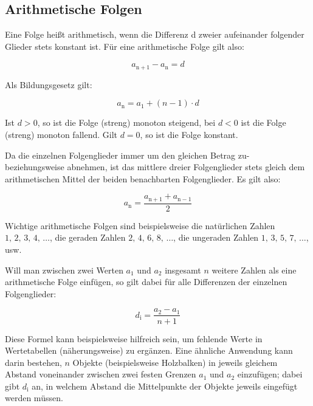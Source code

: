 \newpage
\subsection{Arithmetische Folgen}

Eine Folge heißt arithmetisch, wenn die Differenz d zweier aufeinander folgender Glieder stets konstant ist.
Für eine arithmetische Folge gilt also:

$$a_{\mathrm{n + 1}} - a_{\mathrm{n}} = d$$

Als Bildungsgesetz gilt:

$$a_{\mathrm{n}} =  a_1 + (n - 1) \cdot d$$

Ist $d > 0$, so ist die Folge (streng) monoton steigend, bei $d < 0$ ist die Folge (streng) monoton fallend. Gilt $d=0$, so ist die Folge konstant.

Da die einzelnen Folgenglieder immer um den gleichen Betrag zu- beziehungsweise abnehmen, ist das mittlere dreier Folgenglieder stets gleich dem arithmetischen Mittel der beiden benachbarten Folgenglieder.
Es gilt also:

$$a_{\mathrm{n}} = \frac{a_{\mathrm{n + 1}} + a_{\mathrm{n-1}}}{2}$$

Wichtige arithmetische Folgen sind beispielsweise die natürlichen Zahlen $1 ,\, 2 ,\, 3 ,\, 4 ,\, \ldots$,
die geraden Zahlen $2 ,\, 4 ,\, 6 ,\, 8 ,\, \ldots$, die ungeraden Zahlen $1 ,\, 3 ,\, 5 ,\, 7 ,\,\ldots$, usw.

Will man zwischen zwei Werten $a_1$ und $a_2$ insgesamt $n$ weitere Zahlen als eine arithmetische Folge einfügen, so gilt dabei für alle Differenzen der einzelnen Folgenglieder:

$$d_{\mathrm{i}} = \frac{a_2 - a_1}{n + 1}$$

Diese Formel kann beispielsweise hilfreich sein, um fehlende Werte in Wertetabellen (näherungsweise) zu ergänzen.
Eine ähnliche Anwendung kann darin bestehen, $n$ Objekte (beispielsweise Holzbalken) in jeweils gleichem Abstand voneinander zwischen zwei festen Grenzen $a_1$ und $a_2$ einzufügen; dabei gibt $d_{\mathrm{i}}$ an, in welchem Abstand die Mittelpunkte der Objekte jeweils eingefügt werden müssen.